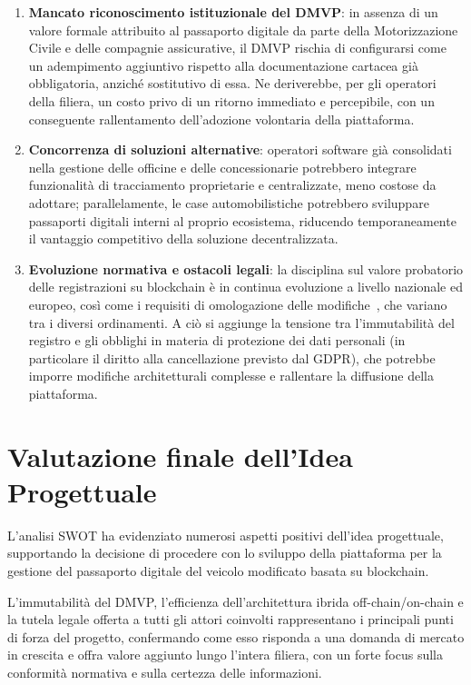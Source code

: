 \begin{enumerate}
    \item \textbf{Mancato riconoscimento istituzionale del DMVP}: in assenza di un valore formale attribuito al passaporto digitale da parte della Motorizzazione Civile e delle compagnie assicurative, il DMVP rischia di configurarsi come un adempimento aggiuntivo rispetto alla documentazione cartacea già obbligatoria, anziché sostitutivo di essa. Ne deriverebbe, per gli operatori della filiera, un costo privo di un ritorno immediato e percepibile, con un conseguente rallentamento dell'adozione volontaria della piattaforma.

    \item \textbf{Concorrenza di soluzioni alternative}: operatori software già consolidati nella gestione delle officine e delle concessionarie potrebbero integrare funzionalità di tracciamento proprietarie e centralizzate, meno costose da adottare; parallelamente, le case automobilistiche potrebbero sviluppare passaporti digitali interni al proprio ecosistema, riducendo temporaneamente il vantaggio competitivo della soluzione decentralizzata.

    \item \textbf{Evoluzione normativa e ostacoli legali}: la disciplina sul valore probatorio delle registrazioni su blockchain è in continua evoluzione a livello nazionale ed europeo, così come i requisiti di omologazione delle modifiche~\cite{cds,dpr495}, che variano tra i diversi ordinamenti. A ciò si aggiunge la tensione tra l'immutabilità del registro e gli obblighi in materia di protezione dei dati personali (in particolare il diritto alla cancellazione previsto dal GDPR), che potrebbe imporre modifiche architetturali complesse e rallentare la diffusione della piattaforma.
\end{enumerate}

\section{Valutazione finale dell'Idea Progettuale}

L'analisi SWOT ha evidenziato numerosi aspetti positivi dell'idea progettuale, supportando la decisione di procedere con lo sviluppo della piattaforma per la gestione del passaporto digitale del veicolo modificato basata su blockchain.

L'immutabilità del DMVP, l'efficienza dell'architettura ibrida off-chain/on-chain e la tutela legale offerta a tutti gli attori coinvolti rappresentano i principali punti di forza del progetto, confermando come esso risponda a una domanda di mercato in crescita e offra valore aggiunto lungo l'intera filiera, con un forte focus sulla conformità normativa e sulla certezza delle informazioni.

